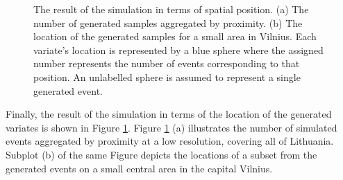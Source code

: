 \documentclass[12pt]{article}
\theoremstyle{definition}
\begin{document}
 \begin{figure}[!ht]
    \centering
    \qquad
    \caption{The result of the simulation in terms of spatial position. (a) The number of generated samples aggregated by proximity. (b) The location of the generated samples for a small area in Vilnius. Each variate's location is represented by a blue sphere where the assigned number represents the number of events corresponding to that position. An unlabelled sphere is assumed to represent a single generated event.}%
    \label{fig:result}
\end{figure}

Finally, the result of the simulation in terms of the location of the generated variates is shown in Figure \ref{fig:result}. Figure \ref{fig:result} (a) illustrates the number of simulated events aggregated by proximity at a low resolution, covering all of Lithuania. Subplot (b) of the same Figure depicts the locations of a subset from the generated events on a small central area in the capital Vilnius.  
\end{document}
